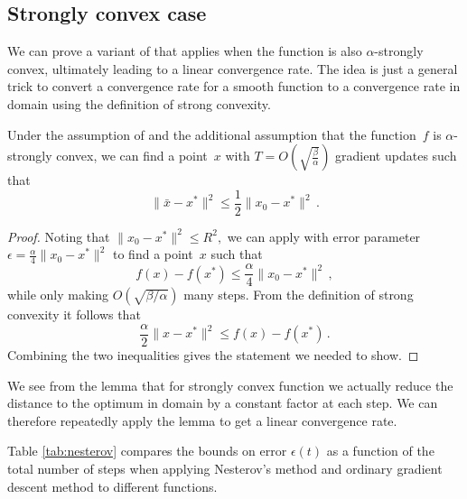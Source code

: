\subsection{Strongly convex case}

We can prove a variant of  that applies when the
function is also $\alpha$-strongly convex, ultimately leading to a linear
convergence rate. The idea is just a general trick to convert a convergence rate
for a smooth function to a convergence rate in domain using the definition of
strong convexity.

\begin{lemma}
Under the assumption of  and the additional assumption
that the function~$f$ is $\alpha$-strongly convex, we 
can find a point~$x$ with $T = O\left(\sqrt{\frac{\beta}{\alpha}}\right)$
gradient updates such that
\[
\|\bar x - x^*\|^2 \leq \frac12\|x_0-x^*\|^2\,.
\]
\end{lemma}
\begin{proof}
Noting that $\|x_0-x^*\|^2\le R^2,$ we can apply  with
error parameter $\epsilon = \frac{\alpha}4 \|x_0-x^*\|^2$ to find a point~$x$ such that
\[
f(x)-f(x^*)\le \frac\alpha4\|x_0-x^*\|^2\,,
\]
while only making $O\left(\sqrt{\beta/\alpha}\right)$ many steps.
From the definition of strong convexity it follows that
\[
\frac\alpha2 \|x-x^*\|^2 \le f(x)-f(x^*)\,.
\]
Combining the two inequalities gives the statement we needed to show.
\end{proof}

We see from the lemma that for strongly convex function we actually reduce the
distance to the optimum in domain by a constant factor at each step. We can
therefore repeatedly apply the lemma to get a linear convergence rate.

Table \ref{tab:nesterov} compares the bounds on error $\epsilon(t)$ as a
function of the total number of steps when applying Nesterov's method and
ordinary gradient descent method to different functions. 

